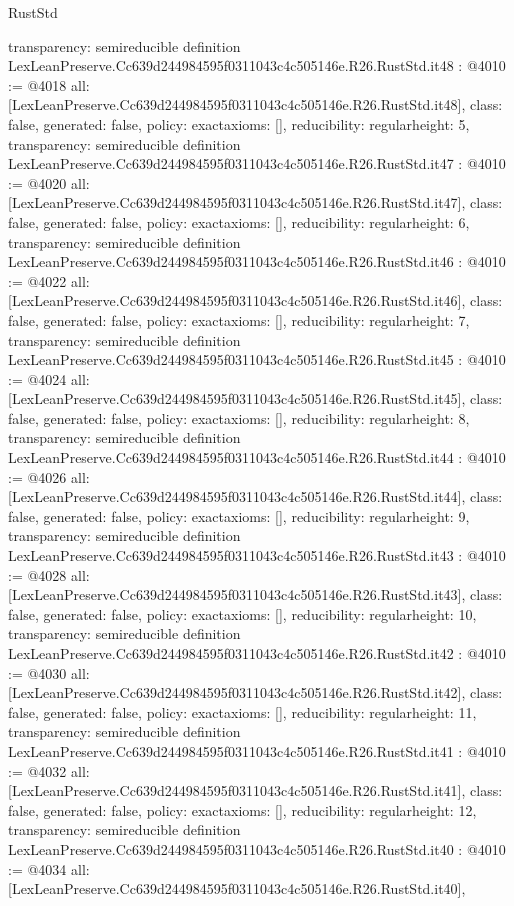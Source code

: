 \begin{lexlean}{RustStd}
\begin{coremodule}
{  transparency: semireducible
}
definition LexLeanPreserve.Cc639d244984595f0311043c4c505146e.R26.RustStd.it48 : @4010 := @4018 {
  all: [LexLeanPreserve.Cc639d244984595f0311043c4c505146e.R26.RustStd.it48],
  class: false,
  generated: false,
  policy: exact{axioms: []},
  reducibility: regular{height: 5},
  transparency: semireducible
}
definition LexLeanPreserve.Cc639d244984595f0311043c4c505146e.R26.RustStd.it47 : @4010 := @4020 {
  all: [LexLeanPreserve.Cc639d244984595f0311043c4c505146e.R26.RustStd.it47],
  class: false,
  generated: false,
  policy: exact{axioms: []},
  reducibility: regular{height: 6},
  transparency: semireducible
}
definition LexLeanPreserve.Cc639d244984595f0311043c4c505146e.R26.RustStd.it46 : @4010 := @4022 {
  all: [LexLeanPreserve.Cc639d244984595f0311043c4c505146e.R26.RustStd.it46],
  class: false,
  generated: false,
  policy: exact{axioms: []},
  reducibility: regular{height: 7},
  transparency: semireducible
}
definition LexLeanPreserve.Cc639d244984595f0311043c4c505146e.R26.RustStd.it45 : @4010 := @4024 {
  all: [LexLeanPreserve.Cc639d244984595f0311043c4c505146e.R26.RustStd.it45],
  class: false,
  generated: false,
  policy: exact{axioms: []},
  reducibility: regular{height: 8},
  transparency: semireducible
}
definition LexLeanPreserve.Cc639d244984595f0311043c4c505146e.R26.RustStd.it44 : @4010 := @4026 {
  all: [LexLeanPreserve.Cc639d244984595f0311043c4c505146e.R26.RustStd.it44],
  class: false,
  generated: false,
  policy: exact{axioms: []},
  reducibility: regular{height: 9},
  transparency: semireducible
}
definition LexLeanPreserve.Cc639d244984595f0311043c4c505146e.R26.RustStd.it43 : @4010 := @4028 {
  all: [LexLeanPreserve.Cc639d244984595f0311043c4c505146e.R26.RustStd.it43],
  class: false,
  generated: false,
  policy: exact{axioms: []},
  reducibility: regular{height: 10},
  transparency: semireducible
}
definition LexLeanPreserve.Cc639d244984595f0311043c4c505146e.R26.RustStd.it42 : @4010 := @4030 {
  all: [LexLeanPreserve.Cc639d244984595f0311043c4c505146e.R26.RustStd.it42],
  class: false,
  generated: false,
  policy: exact{axioms: []},
  reducibility: regular{height: 11},
  transparency: semireducible
}
definition LexLeanPreserve.Cc639d244984595f0311043c4c505146e.R26.RustStd.it41 : @4010 := @4032 {
  all: [LexLeanPreserve.Cc639d244984595f0311043c4c505146e.R26.RustStd.it41],
  class: false,
  generated: false,
  policy: exact{axioms: []},
  reducibility: regular{height: 12},
  transparency: semireducible
}
definition LexLeanPreserve.Cc639d244984595f0311043c4c505146e.R26.RustStd.it40 : @4010 := @4034 {
  all: [LexLeanPreserve.Cc639d244984595f0311043c4c505146e.R26.RustStd.it40],
}
\end{coremodule}
\end{lexlean}
